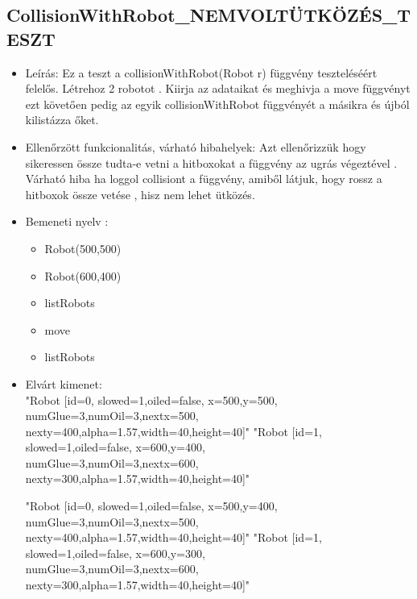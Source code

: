 \subsection{CollisionWithRobot\_NEMVOLTÜTKÖZÉS\_TESZT}
\begin{itemize}
	\item Leírás: Ez a teszt a collisionWithRobot(Robot r) függvény teszteléséért felelős.
			Létrehoz 2 robotot  .
			Kiirja az adataikat  és meghivja a move függvényt ezt követően pedig az egyik collisionWithRobot függvényét a másikra 
			és újból kilistázza őket.			\newline
	\item Ellenőrzött funkcionalitás, várható hibahelyek: Azt ellenőrizzük hogy sikeressen össze tudta-e vetni a hitboxokat a függvény az ugrás végeztével .
	Várható hiba ha loggol collisiont a függvény, amiből látjuk, hogy rossz a hitboxok össze vetése , hisz nem lehet ütközés. 

	
	\item Bemeneti nyelv :
		\begin{itemize}
		\item Robot(500,500)
		\item Robot(600,400)
		\item listRobots
		\item move
		\item listRobots
		\end{itemize}
	

	\item Elvárt kimenet: \\
		"Robot [id=0,  slowed=1,oiled=false, x=500,y=500, 
		\\numGlue=3,numOil=3,nextx=500,
		\\nexty=400,alpha=1.57,width=40,height=40]"\newline
		"Robot [id=1,  slowed=1,oiled=false, x=600,y=400, 
		\\numGlue=3,numOil=3,nextx=600,
		\\nexty=300,alpha=1.57,width=40,height=40]"
		
		 "Robot [id=0,  slowed=1,oiled=false, x=500,y=400, 
		\\numGlue=3,numOil=3,nextx=500,
		\\nexty=400,alpha=1.57,width=40,height=40]"\newline
		"Robot [id=1,  slowed=1,oiled=false, x=600,y=300, 
		\\numGlue=3,numOil=3,nextx=600,
		\\nexty=300,alpha=1.57,width=40,height=40]"\newline
		
\end{itemize}

